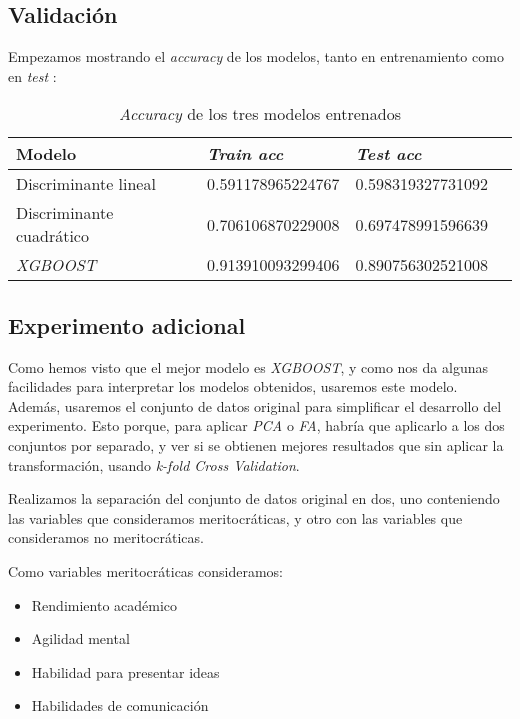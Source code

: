 \subsection{Validación} \label{section:validacion}

Empezamos mostrando el \textit{accuracy} de los modelos, tanto en entrenamiento como en \textit{test} \footnotemark:


\begin{table}[H]
\centering
\begin{tabular}{|l|l|l|l}
\hline
    Modelo               & \textit{Train acc} & \textit{Test acc}          \\
\hline
Discriminante lineal     & 0.591178965224767  & 0.598319327731092 \\
Discriminante cuadrático & 0.706106870229008  & 0.697478991596639 \\
\textit{XGBOOST}         & 0.913910093299406  & 0.890756302521008 \\
\hline
\end{tabular}
\caption{\textit{Accuracy} de los tres modelos entrenados}
\end{table}

\subsection{Experimento adicional}

Como hemos visto que el mejor modelo es \textit{XGBOOST}, y como nos da algunas facilidades para interpretar los modelos obtenidos, usaremos este modelo. Además, usaremos el conjunto de datos original para simplificar el desarrollo del experimento. Esto porque, para aplicar \textit{PCA} o \textit{FA}, habría que aplicarlo a los dos conjuntos por separado, y ver si se obtienen mejores resultados que sin aplicar la transformación, usando \textit{k-fold Cross Validation}.

Realizamos la separación del conjunto de datos original en dos, uno conteniendo las variables que consideramos meritocráticas, y otro con las variables que consideramos no meritocráticas.

Como variables meritocráticas consideramos:

\begin{itemize}
    \item Rendimiento académico
    \item Agilidad mental
    \item Habilidad para presentar ideas
    \item Habilidades de comunicación
\end{itemize}

